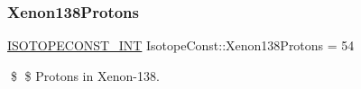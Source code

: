 \subsubsection{\texorpdfstring{Xenon138\+Protons}{Xenon138Protons}}
{\footnotesize\ttfamily \mbox{\hyperlink{group___isotope_const-_macros_ga5f18360b3e99483a35c32d789e62621c}{I\+S\+O\+T\+O\+P\+E\+C\+O\+N\+S\+T\+\_\+\+I\+NT}} Isotope\+Const\+::\+Xenon138\+Protons = 54}

\$ \$ Protons in Xenon-\/138. 